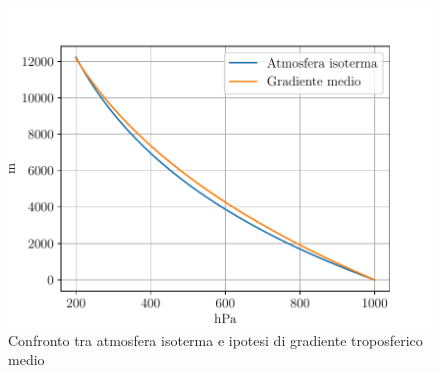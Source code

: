 \begin{figure}[h]     				\centering                                                                  
   \includegraphics[width=.65\textwidth]{figures/iso_vs_grad.pdf} 
	\caption{Confronto tra atmosfera isoterma e ipotesi di gradiente troposferico medio}          
   \label{fig:iso_vs_grad}
\end{figure}         



